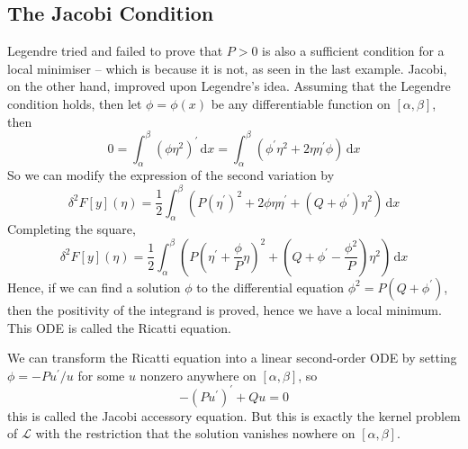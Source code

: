 \documentclass{article}
\begin{document}
\subsection{The Jacobi Condition}
Legendre tried and failed to prove that $P>0$ is also a sufficient condition for a local minimiser -- which is because it is not, as seen in the last example.
Jacobi, on the other hand, improved upon Legendre's idea.
Assuming that the Legendre condition holds, then let $\phi=\phi(x)$ be any differentiable function on $[\alpha,\beta]$, then
$$0=\int_\alpha^\beta (\phi\eta^2)^\prime\,\mathrm dx=\int_\alpha^\beta(\phi^\prime\eta^2+2\eta\eta^\prime\phi)\,\mathrm dx$$
So we can modify the expression of the second variation by
$$\delta^2F[y](\eta)=\frac{1}{2}\int_\alpha^\beta(P(\eta^\prime)^2+2\phi\eta\eta^\prime+(Q+\phi^\prime)\eta^2)\,\mathrm dx$$
Completing the square,
$$\delta^2F[y](\eta)=\frac{1}{2}\int_\alpha^\beta \left( P\left( \eta^\prime+\frac{\phi}{P}\eta \right)^2 +\left( Q+\phi^\prime-\frac{\phi^2}{P} \right)\eta^2\right)\,\mathrm dx$$
Hence, if we can find a solution $\phi$ to the differential equation $\phi^2=P(Q+\phi^\prime)$, then the positivity of the integrand is proved, hence we have a local minimum.
This ODE is called the Ricatti equation.

We can transform the Ricatti equation into a linear second-order ODE by setting $\phi=-Pu^\prime/u$ for some $u$ nonzero anywhere on $[\alpha,\beta]$, so
$$-(Pu^\prime)^\prime+Qu=0$$
this is called the Jacobi accessory equation.
But this is exactly the kernel problem of $\mathcal L$ with the restriction that the solution vanishes nowhere on $[\alpha,\beta]$.
\end{document}
